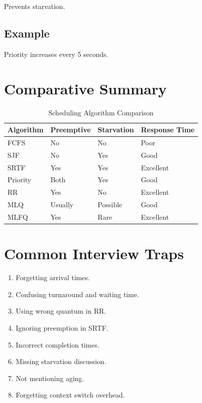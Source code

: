 Prevents starvation.

\subsection{Example}

Priority increases every 5 seconds.

\section{Comparative Summary}

\begin{table}[H]
\centering
\scriptsize
\begin{tabular}{|p{3cm}|p{2cm}|p{2cm}|p{3cm}|}
\hline
Algorithm & Preemptive & Starvation & Response Time \\
\hline
FCFS & No & No & Poor \\
\hline
SJF & No & Yes & Good \\
\hline
SRTF & Yes & Yes & Excellent \\
\hline
Priority & Both & Yes & Good \\
\hline
RR & Yes & No & Excellent \\
\hline
MLQ & Usually & Possible & Good \\
\hline
MLFQ & Yes & Rare & Excellent \\
\hline
\end{tabular}
\caption{Scheduling Algorithm Comparison}
\end{table}

\section{Common Interview Traps}

\begin{enumerate}
\item Forgetting arrival times.
\item Confusing turnaround and waiting time.
\item Using wrong quantum in RR.
\item Ignoring preemption in SRTF.
\item Incorrect completion times.
\item Missing starvation discussion.
\item Not mentioning aging.
\item Forgetting context switch overhead.
\end{enumerate}

